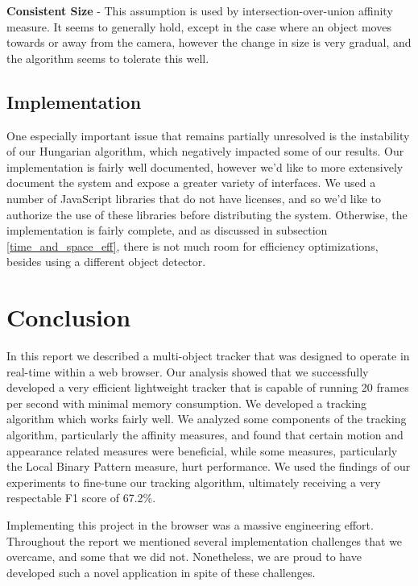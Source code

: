 \documentclass[10pt,twocolumn,letterpaper]{article}
\begin{document}
\textbf{Consistent Size} - This assumption is used by intersection-over-union affinity measure.
It seems to generally hold, except in the case where an object moves towards or away from the camera, however the change in size is very gradual, and the algorithm seems to tolerate this well.


\subsection{Implementation}
One especially important issue that remains partially unresolved is the instability of our Hungarian algorithm, which negatively impacted some of our results.
Our implementation is fairly well documented, however we'd like to more extensively document the system and expose a greater variety of interfaces.
We used a number of JavaScript libraries that do not have licenses, and so we'd like to authorize the use of these libraries before distributing the system.
Otherwise, the implementation is fairly complete, and as discussed in subsection \ref{time_and_space_eff}, there is not much room for efficiency optimizations, besides using a different object detector.


\section{Conclusion}
In this report we described a multi-object tracker that was designed to operate in real-time within a web browser.
Our analysis showed that we successfully developed a very efficient lightweight tracker that is capable of running 20 frames per second with minimal memory consumption.
We developed a tracking algorithm which works fairly well.
We analyzed some components of the tracking algorithm, particularly the affinity measures, and found that certain motion and appearance related measures were beneficial, while some measures, particularly the Local Binary Pattern measure, hurt performance.
We used the findings of our experiments to fine-tune our tracking algorithm, ultimately receiving a very respectable F1 score of 67.2\%.

Implementing this project in the browser was a massive engineering effort.
Throughout the report we mentioned several implementation challenges that we overcame, and some that we did not.
Nonetheless, we are proud to have developed such a novel application in spite of these challenges.



{\small


}
\end{document}
